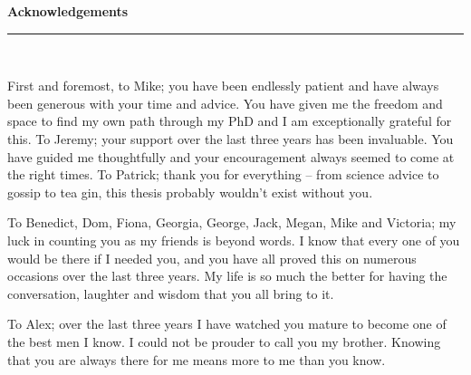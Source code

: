 \thispagestyle{empty}
\begin{raggedleft}
\vspace*{23mm}
\hfill {\huge {\bf {Acknowledgements}}} \\
\vspace{6mm}
\hfill \rule{4in}{.015in} \\
\vspace{19mm}
\end{raggedleft}



\bigskip

\noindent First and foremost, to Mike;  you have been endlessly patient and have always been generous with your time and advice.  You have given me the freedom and space to find my own path through my PhD and I am exceptionally grateful for this.  
To Jeremy; your support over the last three years has been invaluable. You have guided me thoughtfully and  your encouragement always seemed to come at the right times.  
To Patrick; %
thank you for everything -- %
from science advice to gossip to tea gin, this thesis probably wouldn't exist without you.
\bigskip 

\noindent To 
Benedict,
Dom,
Fiona,
Georgia,
George,
Jack,
Megan,
Mike
and
Victoria;  my luck in counting you as my friends is beyond words.  I know that every one of you would be there if I needed you, and you have all proved this on numerous occasions over the last three years.  My life is so much the better for having the conversation, laughter and wisdom that you all bring to it.  

\bigskip
\noindent To Alex;  over the last three years I have watched you mature to become one of the best men I know.  I could not be prouder to call you my brother.  Knowing that you are always there for me means more to me than you know. 

